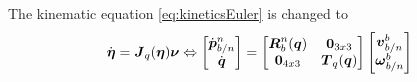 The kinematic equation \eqref{eq:kineticsEuler}  is changed to 
\begin{equation}
\dot{\boldsymbol{\eta}} = \boldsymbol{J}_q(\boldsymbol{\eta})\boldsymbol{\nu}
\Leftrightarrow
\begin{bmatrix}
\dot{\boldsymbol{p}}^n_{b/n} \\
\dot{\boldsymbol{q}}
\end{bmatrix}
=
\begin{bmatrix}
\boldsymbol{R}^n_b(\boldsymbol{q}) & \boldsymbol{0}_{3x3} \\
\boldsymbol{0}_{4x3} & \boldsymbol{T}_q(\boldsymbol{q})
\end{bmatrix}
\begin{bmatrix}
\boldsymbol{v}^b_{b/n} \\
\boldsymbol{\omega}^b_{b/n}
\end{bmatrix}
\end{equation}  